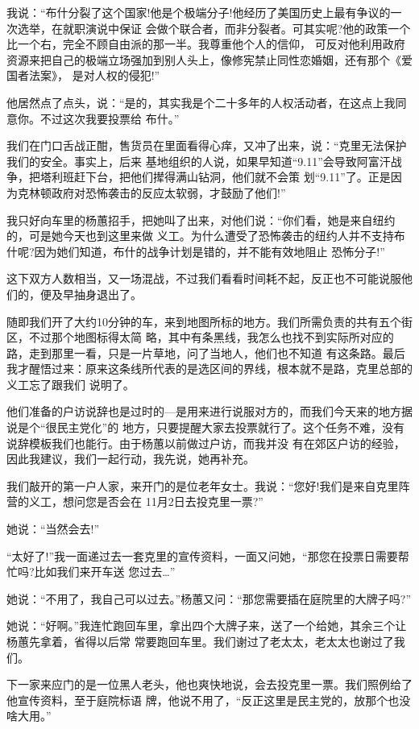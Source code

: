 ﻿\documentclass[11pt]{article}
\begin{document}
我说：``布什分裂了这个国家!他是个极端分子!他经历了美国历史上最有争议的一次选举，在就职演说中保证
会做个联合者，而非分裂者。可其实呢?他的政策一个比一个右，完全不顾自由派的那一半。我尊重他个人的信仰，
可反对他利用政府资源来把自己的极端立场强加到别人头上，像修宪禁止同性恋婚姻，还有那个《爱国者法案》，
是对人权的侵犯!''

他居然点了点头，说：``是的，其实我是个二十多年的人权活动者，在这点上我同意你。不过这次我要投票给
布什。''

我们在门口舌战正酣，售货员在里面看得心痒，又冲了出来，说：``克里无法保护我们的安全。事实上，后来
基地组织的人说，如果早知道``9.11''会导致阿富汗战争，把塔利班赶下台，把他们撵得满山钻洞，他们就不会策
划``9.11''了。正是因为克林顿政府对恐怖袭击的反应太软弱，才鼓励了他们!''

我只好向车里的杨蕙招手，把她叫了出来，对他们说：``你们看，她是来自纽约的，可是她今天也到这里来做
义工。为什么遭受了恐怖袭击的纽约人并不支持布什呢?因为她们知道，布什的战争计划是错的，并不能有效地阻止
恐怖分子!''

这下双方人数相当，又一场混战，不过我们看看时间耗不起，反正也不可能说服他们的，便及早抽身退出了。

随即我们开了大约10分钟的车，来到地图所标的地方。我们所需负责的共有五个街区，不过那个地图标得太简
略，其中有条黑线，我怎么也找不到实际所对应的路，走到那里一看，只是一片草地，问了当地人，他们也不知道
有这条路。最后我才醒悟过来：原来这条线所代表的是选区间的界线，根本就不是路，克里总部的义工忘了跟我们
说明了。

他们准备的户访说辞也是过时的---是用来进行说服对方的，而我们今天来的地方据说是个``很民主党化''的
地方，只要提醒大家去投票就行了。这个任务不难，没有说辞模板我们也能行。由于杨蕙以前做过户访，而我并没
有在郊区户访的经验，因此我建议，我们一起行动，我先说，她再补充。

我们敲开的第一户人家，来开门的是位老年女士。我说：``您好!我们是来自克里阵营的义工，想问您是否会在
11月2日去投克里一票?''


她说：``当然会去!''

``太好了!''我一面递过去一套克里的宣传资料，一面又问她，``那您在投票日需要帮忙吗?比如我们来开车送
您过去\ldots ''

她说：``不用了，我自己可以过去。''杨蕙又问：``那您需要插在庭院里的大牌子吗?''

她说：``好啊。''我连忙跑回车里，拿出四个大牌子来，送了一个给她，其余三个让杨蕙先拿着，省得以后常
常要跑回车里。我们谢过了老太太，老太太也谢过了我们。

下一家来应门的是一位黑人老头，他也爽快地说，会去投克里一票。我们照例给了他宣传资料，至于庭院标语
牌，他说不用了，``反正这里是民主党的，放那个也没啥大用。''
\end{document}
